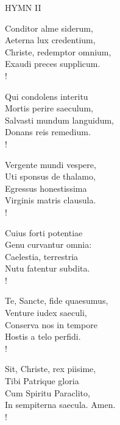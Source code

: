 \small{\uppercase{Hymn II}}\normalsize
\begin{cverse}
Conditor alme siderum,\\
Aeterna lux credentium,\\
Christe, redemptor omnium,\\
Exaudi preces supplicum.\\!

Qui condolens interitu\\
Mortis perire saeculum,\\
Salvasti mundum languidum,\\
Donans reis remedium.\\!

Vergente mundi vespere,\\
Uti sponsus de thalamo,\\
Egressus honestissima\\
Virginis matris clausula.\\!

Cuius forti potentiae\\
Genu curvantur omnia:\\
Caelestia, terrestria\\
Nutu fatentur subdita.\\!

Te, Sancte, fide quaesumus,\\
Venture iudex saeculi,\\
Conserva nos in tempore\\
Hostis a telo perfidi.\\!

Sit, Christe, rex piisime,\\
Tibi Patrique gloria\\
Cum Spiritu Paraclito,\\
In sempiterna saecula. Amen.\\!
\raggedbottom
{}
\label{advent:lastHymn}
\end{cverse}

